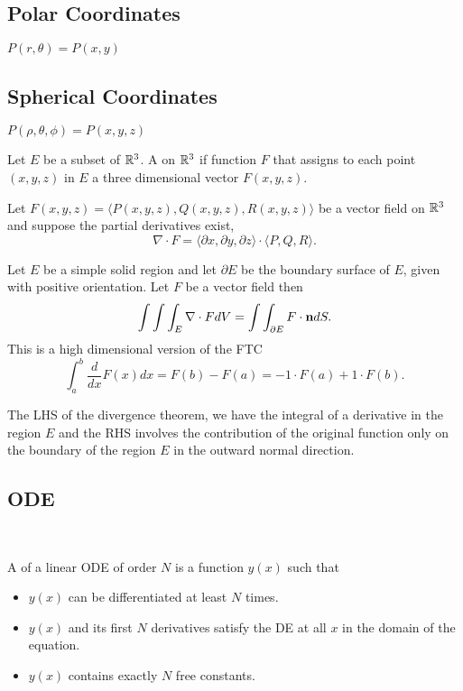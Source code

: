 \documentclass[class=article,crop=false]{standalone}
\begin{document}
\subsection{Polar Coordinates}
$P(r,\theta)=P(x,y)$
\subsection{Spherical Coordinates}
$P(\rho,\theta,\phi)=P(x,y,z)$\\

\begin{defn}
	Let $E$ be a subset of $\mathbb{R}^3$. A  on $\mathbb{R}^3$ if function $F$ that assigns to each point  $(x,y,z)$ in $E$ a three dimensional vector $F(x,y,z)$.
\end{defn}
\begin{defn}[Divergence]
	Let $F(x,y,z)=\langle P(x,y,z),Q(x,y,z),R(x,y,z) \rangle$ be a vector field on $\mathbb{R}^3$ and suppose the partial derivatives exist,
	\[
		\nabla \cdot F = \langle \partial x, \partial y, \partial z \rangle \cdot \langle P,Q,R \rangle
	.\] 
\end{defn}
\begin{thm}
	Let $E$ be a simple solid region and let $\partial E$ be the boundary surface of $E$, given with positive orientation. Let $F$ be a vector field then
	 \[
		 \int \int \int_E \nabla \cdot F dV = \int \int_{\partial E} F \cdot {\boldmath\textbf{n}} dS 
	.\]
	This is a high dimensional version of the FTC
	\[
		\int_{ a}^{ b} \frac{d}{dx} F(x) dx = F(b) - F(a) = -1 \cdot F(a) + 1 \cdot F(b) 
	.\] 
\end{thm}
\begin{note}[]
The LHS of the divergence theorem, we have the integral of a derivative in the region $E$ and the RHS involves the contribution of the original function only on the boundary of the region $E$ in the outward normal direction.
\end{note}

\subsection{ODE}
\\
\begin{defn}
	A  of a linear ODE of order $N$ is a function  $y(x)$ such that
	 \begin{itemize}
		 \item $y(x)$ can be differentiated at least  $N$ times.
		 \item  $y(x)$ and its first  $N$ derivatives satisfy the DE at all  $x$ in the domain of the equation.
		 \item $y(x)$ contains exactly $N$ free constants. 
	\end{itemize}
\end{defn}
\end{document}
